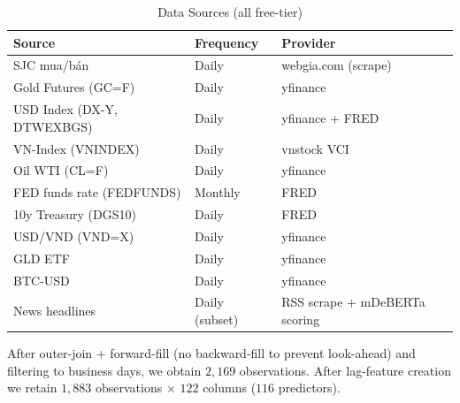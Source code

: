 \documentclass[conference]{IEEEtran}
\begin{document}
\begin{table}[t]
\caption{Data Sources (all free-tier)}
\label{tab:datasources}
\centering
\small
\begin{tabular}{lll}
\toprule
Source & Frequency & Provider \\
\midrule
SJC mua/bán & Daily & webgia.com (scrape) \\
Gold Futures (GC=F) & Daily & yfinance \\
USD Index (DX-Y, DTWEXBGS) & Daily & yfinance + FRED \\
VN-Index (VNINDEX) & Daily & vnstock VCI \\
Oil WTI (CL=F) & Daily & yfinance \\
FED funds rate (FEDFUNDS) & Monthly & FRED \\
10y Treasury (DGS10) & Daily & FRED \\
USD/VND (VND=X) & Daily & yfinance \\
GLD ETF & Daily & yfinance \\
BTC-USD & Daily & yfinance \\
News headlines & Daily (subset) & RSS scrape + mDeBERTa scoring \\
\bottomrule
\end{tabular}
\end{table}

After outer-join + forward-fill (no backward-fill to prevent look-ahead) and filtering to business days, we obtain $2{,}169$ observations. After lag-feature creation we retain $1{,}883$ observations $\times$ $122$ columns ($116$ predictors).
\end{document}
